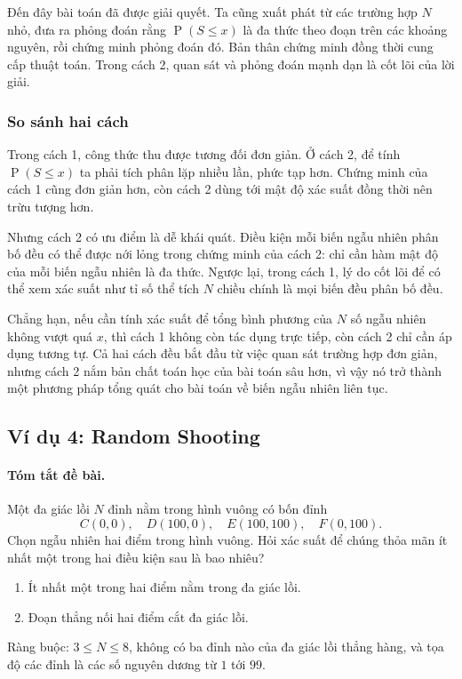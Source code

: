 \documentclass[11pt]{article}
\newcommand{\Prob}{\operatorname{P}}
\begin{document}
Đến đây bài toán đã được giải quyết. Ta cũng xuất phát từ các trường hợp
\(N\) nhỏ, đưa ra phỏng đoán rằng \(\Prob(S\le x)\) là đa thức theo đoạn trên
các khoảng nguyên, rồi chứng minh phỏng đoán đó. Bản thân chứng minh đồng thời
cung cấp thuật toán. Trong cách 2, quan sát và phỏng đoán mạnh dạn là cốt lõi
của lời giải.

\subsubsection{So sánh hai cách}

Trong cách 1, công thức thu được tương đối đơn giản. Ở cách 2, để tính
\(\Prob(S\le x)\) ta phải tích phân lặp nhiều lần, phức tạp hơn. Chứng minh
của cách 1 cũng đơn giản hơn, còn cách 2 dùng tới mật độ xác suất đồng thời
nên trừu tượng hơn.

Nhưng cách 2 có ưu điểm là dễ khái quát. Điều kiện mỗi biến ngẫu nhiên phân bố
đều có thể được nới lỏng trong chứng minh của cách 2: chỉ cần hàm mật độ của
mỗi biến ngẫu nhiên là đa thức. Ngược lại, trong cách 1, lý do cốt lõi để có
thể xem xác suất như tỉ số thể tích \(N\) chiều chính là mọi biến đều phân bố
đều.

Chẳng hạn, nếu cần tính xác suất để tổng bình phương của \(N\) số ngẫu nhiên
không vượt quá \(x\), thì cách 1 không còn tác dụng trực tiếp, còn cách 2 chỉ
cần áp dụng tương tự. Cả hai cách đều bắt đầu từ việc quan sát trường hợp đơn
giản, nhưng cách 2 nắm bản chất toán học của bài toán sâu hơn, vì vậy nó trở
thành một phương pháp tổng quát cho bài toán về biến ngẫu nhiên liên tục.

\subsection{Ví dụ 4: Random Shooting}

\paragraph{Tóm tắt đề bài.}
Một đa giác lồi \(N\) đỉnh nằm trong hình vuông có bốn đỉnh
\[
  C(0,0),\quad D(100,0),\quad E(100,100),\quad F(0,100).
\]
Chọn ngẫu nhiên hai điểm trong hình vuông. Hỏi xác suất để chúng thỏa mãn ít
nhất một trong hai điều kiện sau là bao nhiêu?
\begin{enumerate}
  \item Ít nhất một trong hai điểm nằm trong đa giác lồi.
  \item Đoạn thẳng nối hai điểm cắt đa giác lồi.
\end{enumerate}
Ràng buộc: \(3\le N\le 8\), không có ba đỉnh nào của đa giác lồi thẳng hàng,
và tọa độ các đỉnh là các số nguyên dương từ \(1\) tới \(99\).
\end{document}
